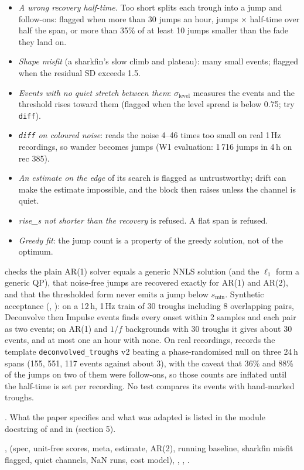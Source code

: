 \begin{itemize}
\item \emph{A wrong recovery half-time.} Too short splits each trough into a jump and
  follow-ons: flagged when more than 30 jumps an hour, jumps $\times$ half-time over half the
  span, or more than 35\% of at least 10 jumps smaller than the fade they land on.
\item \emph{Shape misfit} (a sharkfin's slow climb and plateau): many small events; flagged
  when the residual SD exceeds 1.5.
\item \emph{Events with no quiet stretch between them}: $\sigma_\text{level}$ measures the events
  and the threshold rises toward them (flagged when the level spread is below 0.75; try
  \texttt{diff}).
\item \emph{\texttt{diff} on coloured noise}: reads the noise 4--46 times too small on real 1\,Hz
  recordings, so wander becomes jumps (W1 evaluation: 1\,716 jumps in 4\,h on rec 385).
\item \emph{An estimate on the edge} of its search is flagged as untrustworthy; drift can make
  the estimate impossible, and the block then raises unless the channel is quiet.
\item \emph{rise\_s not shorter than the recovery} is refused. A flat span is refused.
\item \emph{Greedy fit}: the jump count is a property of the greedy solution, not of the optimum.
\end{itemize}

 checks the plain AR(1) solver equals a generic NNLS solution (and
the $\ell_1$ form a generic QP), that noise-free jumps are recovered exactly for AR(1) and AR(2),
and that the thresholded form never emits a jump below $s_{\min}$. Synthetic acceptance
(, ):
on a 12\,h, 1\,Hz train of 30 troughs including 8 overlapping pairs, Deconvolve then Impulse
events finds every onset within 2 samples and each pair as two events; on AR(1) and $1/f$
backgrounds with 30 troughs it gives about 30 events, and at most one an hour with none. On
real recordings,  records the template
\texttt{deconvolved\_troughs} v2 beating a phase-randomised null on three 24\,h spans
(155, 551, 117 events against about 3), with the caveat that 36\% and 88\% of the jumps on two
of them were follow-ons, so those counts are inflated until the half-time is set per recording.
No test compares its events with hand-marked troughs.

\citet{friedrich2017fast}. What the paper specifies and what was adapted is listed in the
module docstring of  and in 
(section 5).

,  (spec, unit-free scores,
meta, estimate, AR(2), running baseline, sharkfin misfit flagged, quiet channels, NaN runs,
cost model), , ,
.
